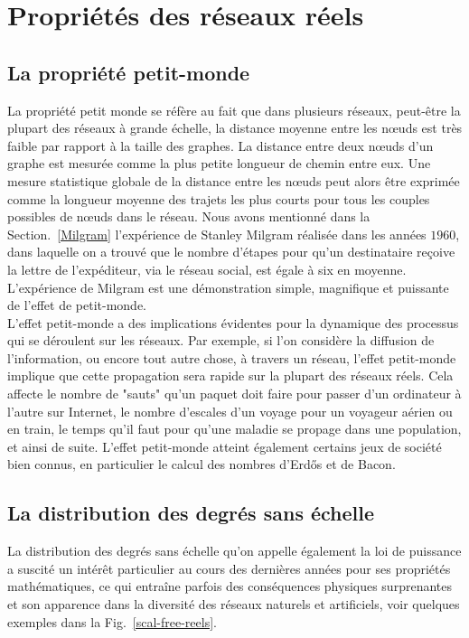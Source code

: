 \section{Propriétés des réseaux réels}
\subsection{La propriété petit-monde}
La propriété petit monde se réfère au fait que dans plusieurs réseaux, peut-être la plupart des réseaux à grande échelle, la distance moyenne entre les nœuds est très faible par rapport à la taille des graphes. La distance entre deux nœuds d'un graphe est mesurée comme la plus petite longueur de chemin entre eux. Une mesure statistique globale de la distance entre les nœuds peut alors être exprimée comme la longueur moyenne des trajets  les plus courts pour tous les couples possibles de nœuds dans le réseau. Nous avons mentionné dans la Section.~\ref{Milgram} l'expérience de Stanley Milgram réalisée dans les années $1960$, dans laquelle on a trouvé que le nombre d'étapes pour qu'un destinataire reçoive la lettre de l'expéditeur, via le réseau social, est égale à six en moyenne. L'expérience de Milgram est une démonstration simple, magnifique et puissante de l'effet de petit-monde.\\
L'effet petit-monde a des implications évidentes pour la dynamique des processus qui se déroulent sur les réseaux. Par exemple, si l'on considère la diffusion de l'information, ou encore tout autre chose, à travers un réseau, l'effet petit-monde implique que cette propagation sera rapide sur la plupart des réseaux réels. Cela affecte le nombre de "sauts" qu'un paquet doit faire pour passer d'un ordinateur à l'autre sur Internet, le nombre d'escales d'un voyage pour un voyageur aérien ou en train, le temps qu'il faut pour qu'une maladie se propage dans
une population, et ainsi de suite. L'effet petit-monde atteint également certains jeux de société bien connus, en particulier le calcul des nombres d'Erd\H{o}s \cite{RG1999} et de Bacon.

\subsection{La distribution des degrés sans échelle}
\label{s-libre-echelle}
La distribution des degrés sans échelle qu'on appelle également la loi de puissance a suscité un intérêt particulier au cours des dernières années pour ses propriétés mathématiques, ce qui entraîne parfois des conséquences physiques surprenantes et son apparence dans la diversité des réseaux naturels et artificiels, voir quelques exemples dans la Fig.~\ref{scal-free-reels}.\\

